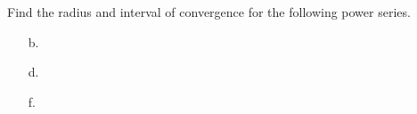 Find the radius and interval of convergence for the following power series.

\begin{enumerate}

    \item[b.] 
    \pagebreak
    \item[d.] 
    \pagebreak
    \item[f.] 

\end{enumerate}